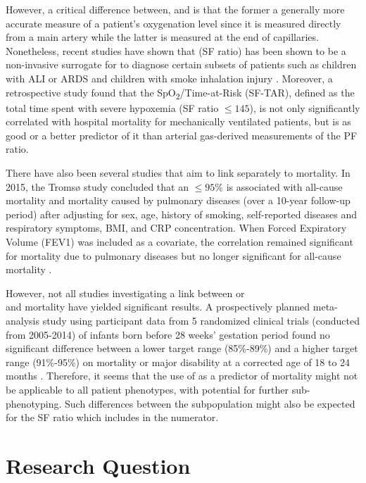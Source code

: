 However, a critical difference between, \Pa and \Sp is that the former a generally more accurate measure of a patient's oxygenation level since it is measured directly from a main artery while the latter is measured at the end of capillaries. Nonetheless, recent studies have shown that \SF (SF ratio) has been shown to be a non-invasive surrogate for \PF to diagnose certain subsets of patients such as children with ALI or ARDS \citep{rice2007comparison} and children with smoke inhalation injury \citep{cambiaso2017correlation}. Moreover, a retrospective study found that the SpO\textsubscript{2}/\Fi Time-at-Risk (SF-TAR), defined as the total time spent with severe hypoxemia (SF ratio $\leq 145$), is not only significantly correlated with hospital mortality for mechanically ventilated patients, but is as good or a better predictor of it than arterial gas-derived measurements of the PF ratio. 

There have also been several studies that aim to link \Sp separately to mortality. In 2015, the Tromsø study concluded that an \Sp $\leq95\%$ is associated with all-cause mortality and mortality caused by pulmonary diseases (over a 10-year follow-up period) after adjusting for sex, age, history of smoking, self-reported diseases and respiratory symptoms, BMI, and CRP concentration. When Forced Expiratory Volume (FEV1) was included as a covariate, the correlation remained significant for mortality due to pulmonary diseases but no longer significant for all-cause mortality \citep{vold2015low}. 

However, not all studies investigating a link between \Sp or \\ \SF and mortality have yielded significant results. A prospectively planned meta-analysis study using participant data from 5 randomized clinical trials (conducted from 2005-2014) of infants born before 28 weeks' gestation period found no significant difference between a lower \Sp target range (85\%-89\%) and a higher \Sp target range (91\%-95\%) on mortality or major disability at a corrected age of 18 to 24 months \citep{askie2018association}. Therefore, it seems that the use of \Sp as a predictor of mortality might not be applicable to all patient phenotypes, with potential for further sub-phenotyping. Such differences between the subpopulation might also be expected for the SF ratio which includes \Sp in the numerator. 


\section{Research Question} 

